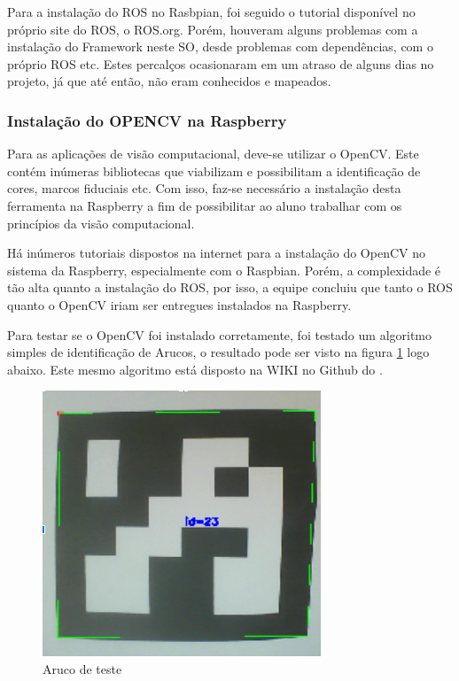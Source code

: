 Para a instalação do ROS no Rasbpian, foi seguido o tutorial disponível no próprio site do ROS, o ROS.org. Porém, houveram alguns problemas com a instalação do Framework neste SO, desde problemas com dependências, com o próprio ROS etc. Estes percalços ocasionaram em um atraso de alguns dias no projeto, já que até então, não eram conhecidos e mapeados.

\subsubsection{Instalação do OPENCV na Raspberry}
Para as aplicações de visão computacional, deve-se utilizar o OpenCV. Este contém inúmeras bibliotecas que viabilizam e possibilitam a identificação de cores, marcos fiduciais etc. Com isso, faz-se necessário a instalação desta ferramenta na Raspberry a fim de possibilitar ao aluno trabalhar com os princípios da visão computacional.

Há inúmeros tutoriais dispostos na internet para a instalação do OpenCV no sistema da Raspberry, especialmente com o Raspbian. Porém, a complexidade é tão alta quanto a instalação do ROS, por isso, a equipe concluiu que tanto o ROS quanto o OpenCV iriam ser entregues instalados na Raspberry.

Para testar se o OpenCV foi instalado corretamente, foi testado um algoritmo simples de identificação de Arucos, o resultado pode ser visto na figura \ref{fig:aruco1} logo abaixo. Este mesmo algoritmo está disposto na WIKI no Github do \cite{wikilearn}.

\begin{figure}[H]
	\centering
	\includegraphics[scale=0.8, angle=0]{Figures/aruco1.png}
	\caption{Aruco de teste}
	\label{fig:aruco1}
\end{figure}


